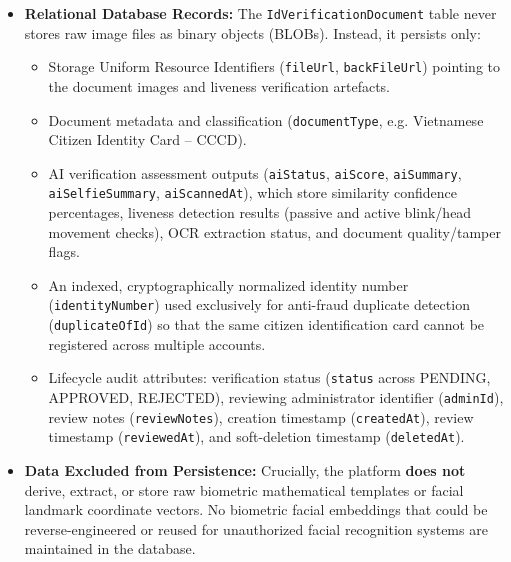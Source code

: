 \begin{itemize}
\item \textbf{Relational Database Records:} The \texttt{IdVerification\allowbreak{}Document} table never stores raw image files as binary objects (BLOBs). Instead, it persists only:
\begin{itemize}
    \item Storage Uniform Resource Identifiers (\texttt{fileUrl}, \texttt{backFileUrl}) pointing to the document images and liveness verification artefacts.
    \item Document metadata and classification (\texttt{documentType}, e.g. Vietnamese Citizen Identity Card -- CCCD).
    \item AI verification assessment outputs (\texttt{aiStatus}, \texttt{aiScore}, \texttt{aiSummary}, \texttt{aiSelfie\allowbreak Summary}, \texttt{aiScannedAt}), which store similarity confidence percentages, liveness detection results (passive and active blink/head movement checks), OCR extraction status, and document quality/tamper flags.
    \item An indexed, cryptographically normalized identity number (\texttt{identityNumber}) used exclusively for anti-fraud duplicate detection (\texttt{duplicateOfId}) so that the same citizen identification card cannot be registered across multiple accounts.
    \item Lifecycle audit attributes: verification status (\texttt{status} across PENDING, APPROVED, REJECTED), reviewing administrator identifier (\texttt{adminId}), review notes (\texttt{reviewNotes}), creation timestamp (\texttt{createdAt}), review timestamp (\texttt{reviewedAt}), and soft-deletion timestamp (\texttt{deletedAt}).
\end{itemize}

\item \textbf{Data Excluded from Persistence:} Crucially, the platform \textbf{does not} derive, extract, or store raw biometric mathematical templates or facial landmark coordinate vectors. No biometric facial embeddings that could be reverse-engineered or reused for unauthorized facial recognition systems are maintained in the database.


\end{itemize}
